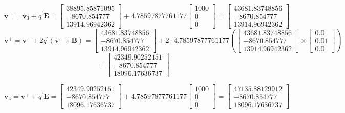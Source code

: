 \documentclass[12pt]{article}
\begin{document}
$\boldsymbol{v}^{-} = \boldsymbol{v}_{3} + q^{\prime} \mathbf{E} = \begin{bmatrix} 
	 38895.85871095 \\ -8670.854777 \\ 13914.96942362
\end{bmatrix} + 4.78597877761177 \begin{bmatrix}
	1000 \\ 0 \\ 0 
\end{bmatrix} = \begin{bmatrix}
	43681.83748856 \\ -8670.854777 \\ 13914.96942362
\end{bmatrix}$
$$\boldsymbol{v}^{+} = \boldsymbol{v}^{-} + 2 q^{\prime} \left( \boldsymbol{v}^{-} \times \mathbf{B} \right) = \begin{bmatrix}
	43681.83748856 \\ -8670.854777 \\ 13914.96942362
\end{bmatrix} + 2 \cdot 4.78597877761177 \left( \begin{bmatrix}
	43681.83748856 \\ -8670.854777 \\ 13914.96942362
\end{bmatrix} \times \begin{bmatrix}
	0.0 \\ 0.01 \\ 0.0
\end{bmatrix} \right)$$ $$ = \begin{bmatrix}
	42349.90252151 \\ -8670.854777  \\ 18096.17636737
\end{bmatrix}$$
\begin{tcolorbox}
	$$\boldsymbol{v}_{4} = \boldsymbol{v}^{+} + q^{\prime} \mathbf{E} = \begin{bmatrix}
	42349.90252151 \\ -8670.854777  \\ 18096.17636737
\end{bmatrix} + 4.78597877761177 \begin{bmatrix}
	1000 \\ 0 \\ 0 
\end{bmatrix} = \begin{bmatrix}
	47135.88129912 \\ -8670.854777 \\ 18096.17636737
\end{bmatrix}$$
\end{tcolorbox}
\end{document}
